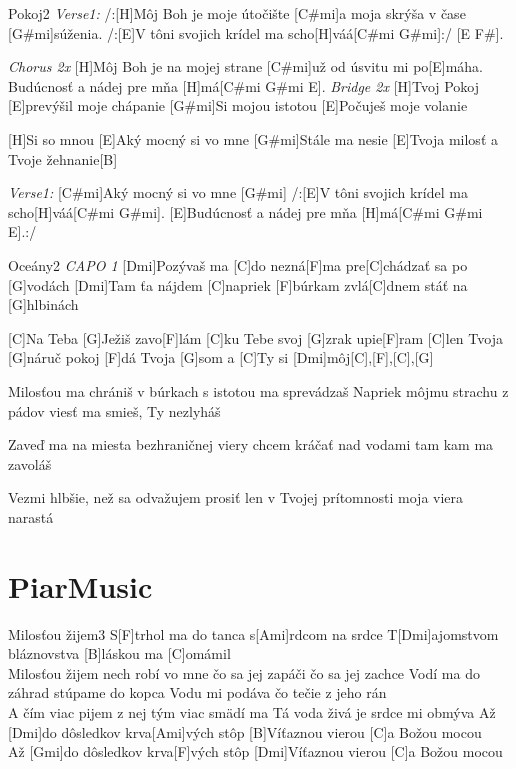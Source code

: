 \documentclass[12pt]{article}
\begin{document}
\begin{song}{Pokoj}{2}
\textit{\color{gray}Verse1:}
/:[H]Môj Boh je moje útočište
[C#mi]a moja skrýša v čase [G#mi]súženia.
/:[E]V tôni svojich krídel ma scho[H]váá[C#mi G#mi]:/
[E F#].

\textit{\color{gray}Chorus 2x}
[H]Môj Boh je na mojej strane
[C#mi]už od úsvitu mi po[E]máha.
Budúcnosť a nádej pre mňa [H]má[C#mi G#mi E].
\columnbreak
\textit{\color{gray}Bridge 2x}
[H]Tvoj Pokoj [E]prevýšil moje chápanie
[G#mi]Si mojou istotou [E]Počuješ moje volanie 

[H]Si so mnou [E]Aký mocný si vo mne
[G#mi]Stále ma nesie [E]Tvoja milosť a Tvoje žehnanie[B]

\textit{\color{gray}Verse1:}
[C#mi]Aký mocný si vo mne [G#mi]
/:[E]V tôni svojich krídel ma scho[H]váá[C#mi G#mi].
[E]Budúcnosť a nádej pre mňa [H]má[C#mi G#mi E].:/
\end{song}

\begin{song}{Oceány}{2}
\textit{\color{gray}CAPO 1}
[Dmi]Pozývaš ma [C]do nezná[F]ma
pre[C]chádzať sa po [G]vodách
[Dmi]Tam ťa nájdem [C]napriek [F]búrkam
zvlá[C]dnem stáť na [G]hlbinách


[C]Na Teba [G]Ježiš zavo[F]lám
[C]ku Tebe svoj [G]zrak upie[F]ram
[C]len Tvoja [G]náruč pokoj [F]dá
Tvoja [G]som a [C]Ty si [Dmi]môj[C],[F],[C],[G]


Milosťou ma chrániš v búrkach
s istotou ma sprevádzaš
Napriek môjmu strachu z pádov
viesť ma smieš, Ty nezlyháš


Zaveď ma na miesta
bezhraničnej viery
chcem kráčať nad vodami
tam kam ma zavoláš

Vezmi hlbšie, než sa
odvažujem prosiť
len v Tvojej prítomnosti
moja viera narastá
\end{song}

\newpage
\section{PiarMusic}


\begin{song}{Milosťou žijem}{3}
	S[F]trhol ma do tanca
	s[Ami]rdcom na srdce
	T[Dmi]ajomstvom bláznovstva
	[B]láskou ma [C]omámil
	\\
	Milosťou žijem
	nech robí vo mne
	čo sa jej zapáči
	čo sa jej zachce
	\columnbreak
	Vodí ma do záhrad
	stúpame do kopca
	Vodu mi podáva
	čo tečie z jeho rán
	\\
	A čím viac pijem z nej
	tým viac smädí ma
	Tá voda živá je
	srdce mi obmýva
	\columnbreak
	Až [Dmi]do dôsledkov
	krva[Ami]vých stôp
	[B]Víťaznou vierou
	[C]a Božou mocou
	\\
	Až [Gmi]do dôsledkov
	krva[F]vých stôp
	[Dmi]Víťaznou vierou
	[C]a Božou mocou
\end{song}
\end{document}
